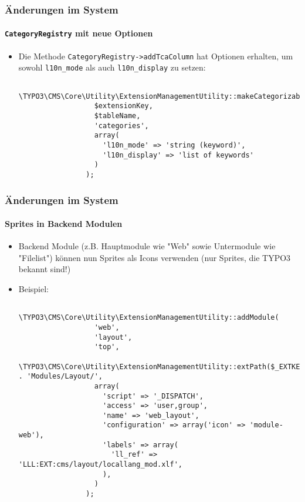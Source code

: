 \begin{frame}[fragile]
	\frametitle{Änderungen im System}
	\framesubtitle{\texttt{CategoryRegistry} mit neue Optionen}

	\lstset{basicstyle=\tiny\ttfamily}

	\begin{itemize}

		\item Die Methode \texttt{CategoryRegistry->addTcaColumn} hat Optionen
			erhalten, um sowohl \texttt{l10n\_mode} als auch \texttt{l10n\_display}
			zu setzen:

			\begin{lstlisting}
				\TYPO3\CMS\Core\Utility\ExtensionManagementUtility::makeCategorizable(
				  $extensionKey,
				  $tableName,
				  'categories',
				  array(
				    'l10n_mode' => 'string (keyword)',
				    'l10n_display' => 'list of keywords'
				  )
				);
			\end{lstlisting}

	\end{itemize}

\end{frame}


\begin{frame}[fragile]
	\frametitle{Änderungen im System}
	\framesubtitle{Sprites in Backend Modulen}

	\lstset{basicstyle=\tiny\ttfamily}

	\begin{itemize}

		\item Backend Module (z.B. Hauptmodule wie "Web" sowie Untermodule wie
			"Filelist") können nun Sprites als Icons verwenden\newline
			\small
				(nur Sprites, die TYPO3 bekannt sind!)
			\normalsize

		\item Beispiel:

			\begin{lstlisting}
				\TYPO3\CMS\Core\Utility\ExtensionManagementUtility::addModule(
				  'web',
				  'layout',
				  'top',
				  \TYPO3\CMS\Core\Utility\ExtensionManagementUtility::extPath($_EXTKEY) . 'Modules/Layout/',
				  array(
				    'script' => '_DISPATCH',
				    'access' => 'user,group',
				    'name' => 'web_layout',
				    'configuration' => array('icon' => 'module-web'),
				    'labels' => array(
				      'll_ref' => 'LLL:EXT:cms/layout/locallang_mod.xlf',
				    ),
				  )
				);
			\end{lstlisting}

	\end{itemize}

\end{frame}

